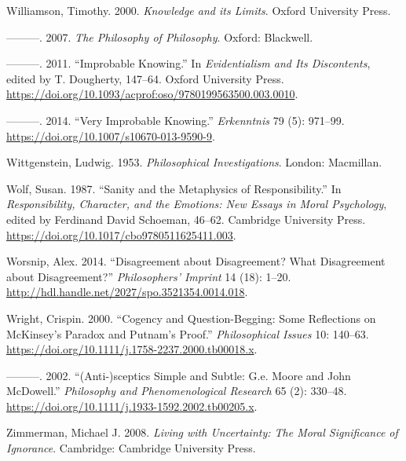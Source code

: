 \documentclass[
  10pt,
  letterpaper,
  twoside]{scrbook}
\newlength{\cslhangindent}
\newenvironment{CSLReferences}[2] %
 {\begin{list}{}{%
  \setlength{\itemindent}{0pt}
  \setlength{\leftmargin}{0pt}
  \setlength{\parsep}{0pt}
  \ifodd #1
   \setlength{\leftmargin}{\cslhangindent}
   \setlength{\itemindent}{-1\cslhangindent}
  \fi
  \setlength{\itemsep}{#2\baselineskip}}}
 {\end{list}}
\begin{document}
\begin{CSLReferences}{1}{0}
Williamson, Timothy. 2000. \emph{{Knowledge and its Limits}}. Oxford
University Press.

---------. 2007. \emph{The Philosophy of Philosophy}. Oxford: Blackwell.

---------. 2011. {``{I}mprobable {K}nowing.''} In \emph{{E}videntialism
and Its {D}iscontents}, edited by T. Dougherty, 147--64. {O}xford
{U}niversity {P}ress.
\url{https://doi.org/10.1093/acprof:oso/9780199563500.003.0010}.

---------. 2014. {``Very Improbable Knowing.''} \emph{Erkenntnis} 79
(5): 971--99. \url{https://doi.org/10.1007/s10670-013-9590-9}.

Wittgenstein, Ludwig. 1953. \emph{Philosophical Investigations}. London:
Macmillan.

Wolf, Susan. 1987. {``Sanity and the Metaphysics of Responsibility.''}
In \emph{{R}esponsibility, {C}haracter, and the {E}motions: {N}ew
{E}ssays in {M}oral {P}sychology}, edited by Ferdinand David Schoeman,
46--62. {C}ambridge {U}niversity {P}ress.
\url{https://doi.org/10.1017/cbo9780511625411.003}.

Worsnip, Alex. 2014. {``Disagreement about Disagreement? What
Disagreement about Disagreement?''} \emph{Philosophers' Imprint} 14
(18): 1--20. \url{http://hdl.handle.net/2027/spo.3521354.0014.018}.

Wright, Crispin. 2000. {``Cogency and Question-Begging: Some Reflections
on McKinsey's Paradox and Putnam's Proof.''} \emph{Philosophical Issues}
10: 140--63. \url{https://doi.org/10.1111/j.1758-2237.2000.tb00018.x}.

---------. 2002. {``(Anti-)sceptics Simple and Subtle: G.e. Moore and
John McDowell.''} \emph{Philosophy and Phenomenological Research} 65
(2): 330--48. \url{https://doi.org/10.1111/j.1933-1592.2002.tb00205.x}.

Zimmerman, Michael J. 2008. \emph{Living with Uncertainty: The Moral
Significance of Ignorance}. Cambridge: Cambridge University Press.

\end{CSLReferences}


\backmatter
\end{document}
